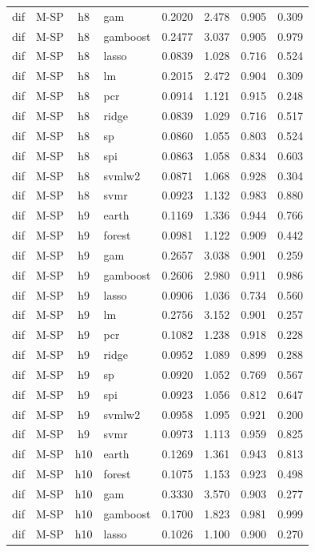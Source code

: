\begin{ThreePartTable}
\begin{longtable}[t]{llclcccc}
dif & M-SP & h8 & gam & 0.2020 & 2.478 & 0.905 & 0.309\\
dif & M-SP & h8 & gamboost & 0.2477 & 3.037 & 0.905 & 0.979\\
dif & M-SP & h8 & lasso & 0.0839 & 1.028 & 0.716 & 0.524\\
dif & M-SP & h8 & lm & 0.2015 & 2.472 & 0.904 & 0.309\\
dif & M-SP & h8 & pcr & 0.0914 & 1.121 & 0.915 & 0.248\\
dif & M-SP & h8 & ridge & 0.0839 & 1.029 & 0.716 & 0.517\\
dif & M-SP & h8 & sp & 0.0860 & 1.055 & 0.803 & 0.524\\
dif & M-SP & h8 & spi & 0.0863 & 1.058 & 0.834 & 0.603\\
dif & M-SP & h8 & svmlw2 & 0.0871 & 1.068 & 0.928 & 0.304\\
dif & M-SP & h8 & svmr & 0.0923 & 1.132 & 0.983 & 0.880\\
\addlinespace
dif & M-SP & h9 & earth & 0.1169 & 1.336 & 0.944 & 0.766\\
dif & M-SP & h9 & forest & 0.0981 & 1.122 & 0.909 & 0.442\\
dif & M-SP & h9 & gam & 0.2657 & 3.038 & 0.901 & 0.259\\
dif & M-SP & h9 & gamboost & 0.2606 & 2.980 & 0.911 & 0.986\\
dif & M-SP & h9 & lasso & 0.0906 & 1.036 & 0.734 & 0.560\\
dif & M-SP & h9 & lm & 0.2756 & 3.152 & 0.901 & 0.257\\
dif & M-SP & h9 & pcr & 0.1082 & 1.238 & 0.918 & 0.228\\
dif & M-SP & h9 & ridge & 0.0952 & 1.089 & 0.899 & 0.288\\
dif & M-SP & h9 & sp & 0.0920 & 1.052 & 0.769 & 0.567\\
dif & M-SP & h9 & spi & 0.0923 & 1.056 & 0.812 & 0.647\\
dif & M-SP & h9 & svmlw2 & 0.0958 & 1.095 & 0.921 & 0.200\\
dif & M-SP & h9 & svmr & 0.0973 & 1.113 & 0.959 & 0.825\\
\addlinespace
dif & M-SP & h10 & earth & 0.1269 & 1.361 & 0.943 & 0.813\\
dif & M-SP & h10 & forest & 0.1075 & 1.153 & 0.923 & 0.498\\
dif & M-SP & h10 & gam & 0.3330 & 3.570 & 0.903 & 0.277\\
dif & M-SP & h10 & gamboost & 0.1700 & 1.823 & 0.981 & 0.999\\
dif & M-SP & h10 & lasso & 0.1026 & 1.100 & 0.900 & 0.270\\

\end{longtable}
\end{ThreePartTable}
